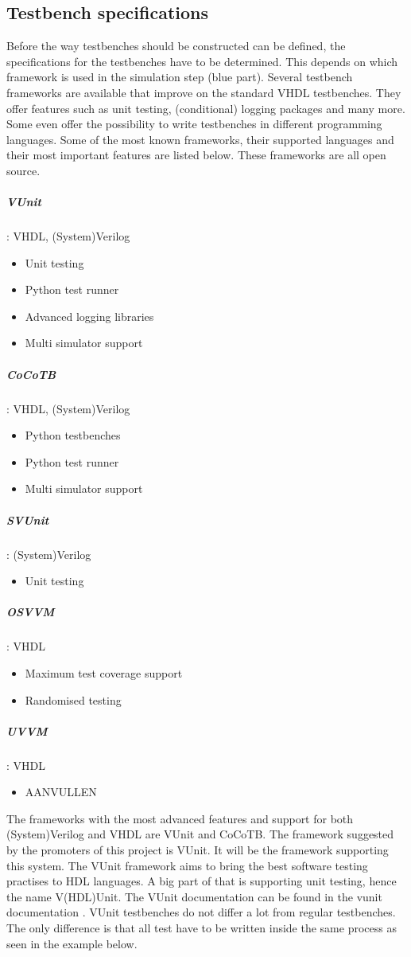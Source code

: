 \subsection{Testbench specifications}
Before the way testbenches should be constructed can be defined, the specifications for the testbenches have to be determined. This depends on which framework is used in the simulation step (blue part). Several testbench frameworks are available that improve on the standard VHDL testbenches. They offer features such as unit testing, (conditional) logging packages and many more. Some even offer the possibility to write testbenches in different programming languages.
\npar
Some of the most known frameworks, their supported languages and their most important features are listed below. These frameworks are all open source.
\subparagraph{VUnit}: VHDL, (System)Verilog
\begin{itemize}
	\item Unit testing
	\item Python test runner
	\item Advanced logging libraries
	\item Multi simulator support
\end{itemize}
\subparagraph{CoCoTB}: VHDL, (System)Verilog
\begin{itemize}
	\item Python testbenches
	\item Python test runner
	\item Multi simulator support	
\end{itemize}
\subparagraph{SVUnit}\cite{svunit}: (System)Verilog
\begin{itemize}
	\item Unit testing
\end{itemize}
\subparagraph{OSVVM}\cite{osvvm}: VHDL
\begin{itemize}
	\item Maximum test coverage support
	\item Randomised testing
\end{itemize}
\subparagraph{UVVM}\cite{uvvm}: VHDL
\begin{itemize}
	\item AANVULLEN
\end{itemize}\nline
The frameworks with the most advanced features and support for both (System)Verilog and VHDL are VUnit and CoCoTB. The framework suggested by the promoters of this project is VUnit. It will be the framework supporting this system.
\npar
The VUnit framework aims to bring the best software testing practises to HDL languages. A big part of that is supporting unit testing, hence the name V(HDL)Unit. The VUnit documentation can be found in the vunit documentation \cite{vunit_doc}. VUnit testbenches do not differ a lot from regular testbenches. The only difference is that all test have to be written inside the same process as seen in the example below.
